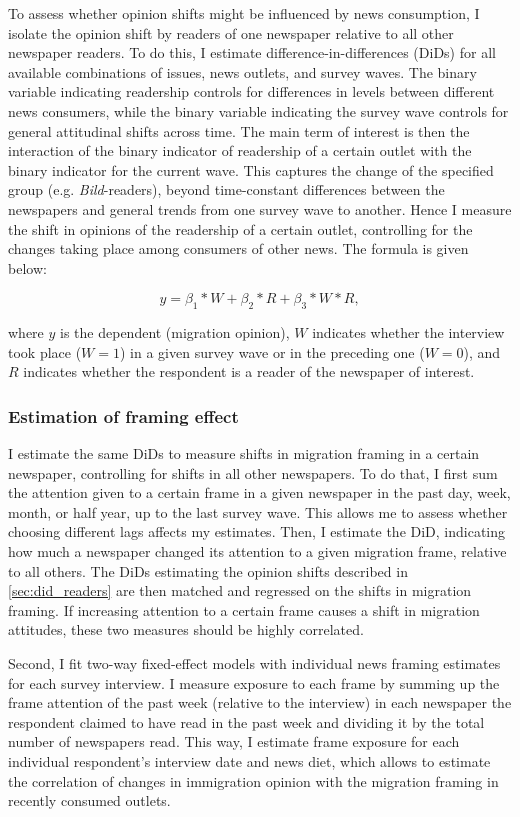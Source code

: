 \documentclass{article}
\begin{document}
To assess whether opinion shifts might be influenced by news consumption, I isolate the opinion shift by readers of one newspaper relative to all other newspaper readers. To do this, I estimate difference-in-differences (DiDs) for all available combinations of issues, news outlets, and survey waves. The binary variable indicating readership controls for differences in levels between different news consumers, while the binary variable indicating the survey wave controls for general attitudinal shifts across time. The main term of interest is then the interaction of the binary indicator of readership of a certain outlet with the binary indicator for the current wave. This captures the change of the specified group (e.g. \textit{Bild}-readers), beyond time-constant differences between the newspapers and general trends from one survey wave to another. Hence I measure the shift in opinions of the readership of a certain outlet, controlling for the changes taking place among consumers of other news. The formula is given below:

$$ y = \beta_1 * W + \beta_2 * R + \beta_3 * W * R, $$

where $y$ is the dependent (migration opinion), $W$ indicates whether the interview took place ($W = 1$) in a given survey wave or in the preceding one ($W = 0$), and $R$ indicates whether the respondent is a reader of the newspaper of interest.


\subsubsection{Estimation of framing effect}\label{sec:models}

I estimate the same DiDs to measure shifts in migration framing in a certain newspaper, controlling for shifts in all other newspapers. To do that, I first sum the attention given to a certain frame in a given newspaper in the past day, week, month, or half year, up to the last survey wave. This allows me to assess whether choosing different lags affects my estimates. Then, I estimate the DiD, indicating how much a newspaper changed its attention to a given migration frame, relative to all others. The DiDs estimating the opinion shifts described in \ref{sec:did_readers} are then matched and regressed on the shifts in migration framing. If increasing attention to a certain frame causes a shift in migration attitudes, these two measures should be highly correlated.

Second, I fit two-way fixed-effect models with individual news framing estimates for each survey interview. I measure exposure to each frame by summing up the frame attention of the past week (relative to the interview) in each newspaper the respondent claimed to have read in the past week and dividing it by the total number of newspapers read. This way, I estimate frame exposure for each individual respondent's interview date and news diet, which allows to estimate the correlation of changes in immigration opinion with the migration framing in recently consumed outlets.
\end{document}
